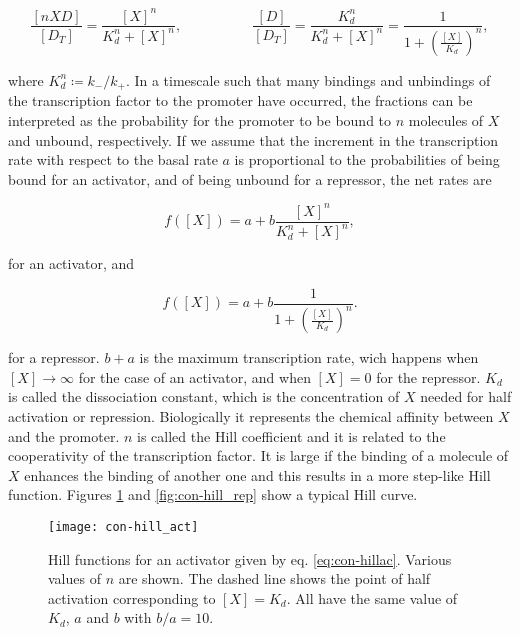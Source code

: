 \begin{equation*}
  \frac{[nXD]}{[D_T]} = \frac{[X]^n}{K_d^n+[X]^n}, \quad\quad\quad\quad\quad  \frac{[D]}{[D_T]} = \frac{K_d^n}{K_d^n+[X]^n} = \frac{1}{1+\left(\frac{[X]}{K_d}\right)^n},
\end{equation*}

where $K_d^n \coloneqq k_-/k_+$. In a timescale such that many bindings and unbindings of the transcription factor to the promoter have occurred, the fractions can be interpreted as the probability for the promoter to be bound to $n$ molecules of $X$ and unbound, respectively. If we assume that the increment in the transcription rate with respect to the basal rate $a$ is proportional to the probabilities of being bound for an activator, and of being unbound for a repressor, the net rates are

\begin{equation}
  \label{eq:con-hillac}
  f([X]) = a + b \frac{[X]^n}{K_d^n+[X]^n},
\end{equation}

for an activator, and

\begin{equation}
  \label{eq:con-hillrep}
  f([X]) = a + b \frac{1}{1+\left(\frac{[X]}{K_d}\right)^n}.
\end{equation}

for a repressor. $b+a$ is the maximum transcription rate, wich happens when $[X]\rightarrow\infty$ for the case of an activator, and when $[X]=0$ for the repressor. $K_d$ is called the dissociation constant, which is the concentration of $X$ needed for half activation or repression. Biologically it represents the chemical affinity between $X$ and the promoter. $n$ is called the Hill coefficient and it is related to the cooperativity of the transcription factor. It is large if the binding of a molecule of $X$ enhances the binding of another one and this results in a more step-like Hill function. Figures \ref{fig:con-hill_act} and \ref{fig:con-hill_rep} show a typical Hill curve.

\begin{figure}[H]
  \centering
  \texttt{[image: con-hill\_act]}
  \caption[Hill functions for an activator]{\label{fig:con-hill_act} Hill functions for an activator given by eq. \eqref{eq:con-hillac}. Various values of $n$ are shown. The dashed line shows the point of half activation corresponding to $[X]=K_d$. All have the same value of $K_d$, $a$ and $b$ with $b/a=10$.}
\end{figure}

